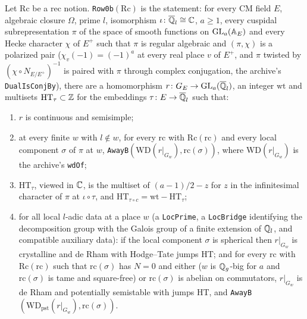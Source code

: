 \begin{definition}\label{fam:props-b}
Let $\mathrm{Rc}$ be a rec notion. \texttt{Row0b}$(\mathrm{Rc})$ is the statement: for every CM field $E$, algebraic closure $\Omega$, prime $l$, isomorphism $\iota\colon\overline{\mathbb{Q}}_l\cong\mathbb{C}$, $a\ge1$, every cuspidal subrepresentation $\pi$ of the space of smooth functions on $\mathrm{GL}_a(\mathbb{A}_E)$ and every Hecke character $\chi$ of $E^+$ such that $\pi$ is regular algebraic and $(\pi,\chi)$ is a polarized pair ($\chi_v(-1)=(-1)^a$ at every real place $v$ of $E^+$, and $\pi$ twisted by $(\chi\circ N_{E/E^+})^{-1}$ is paired with $\pi$ through complex conjugation, the archive's \texttt{DualIsConjBy}), there are a homomorphism $r\colon G_E\to\mathrm{GL}_a(\overline{\mathbb{Q}}_l)$, an integer $\mathrm{wt}$ and multisets $\mathrm{HT}_{\tau}\subset\mathbb{Z}$ for the embeddings $\tau\colon E\to\overline{\mathbb{Q}}_l$ such that:
\begin{enumerate}
\item $r$ is continuous and semisimple;
\item at every finite $w$ with $l\notin w$, for every $\mathrm{rc}$ with $\mathrm{Rc}(\mathrm{rc})$ and every local component $\sigma$ of $\pi$ at $w$, \texttt{AwayB}$(\mathrm{WD}(r|_{G_w}),\mathrm{rc}(\sigma))$, where $\mathrm{WD}(r|_{G_w})$ is the archive's \texttt{wdOf};
\item $\mathrm{HT}_{\tau}$, viewed in $\mathbb{C}$, is the multiset of $(a-1)/2-z$ for $z$ in the infinitesimal character of $\pi$ at $\iota\circ\tau$, and $\mathrm{HT}_{\tau\circ c}=\mathrm{wt}-\mathrm{HT}_{\tau}$;
\item for all local $l$-adic data at a place $w$ (a \texttt{LocPrime}, a \texttt{LocBridge} identifying the decomposition group with the Galois group of a finite extension of $\mathbb{Q}_l$, and compatible auxiliary data): if the local component $\sigma$ is spherical then $r|_{G_w}$ is crystalline and de Rham with Hodge--Tate jumps $\mathrm{HT}$; and for every $\mathrm{rc}$ with $\mathrm{Rc}(\mathrm{rc})$ such that $\mathrm{rc}(\sigma)$ has $N=0$ and either ($w$ is $\mathbb{Q}_g$-big for $a$ and $\mathrm{rc}(\sigma)$ is tame and square-free) or $\mathrm{rc}(\sigma)$ is abelian on commutators, $r|_{G_w}$ is de Rham and potentially semistable with jumps $\mathrm{HT}$, and \texttt{AwayB}$(\mathrm{WD}_{\mathrm{pst}}(r|_{G_w}),\mathrm{rc}(\sigma))$.
\end{enumerate}
\end{definition}

